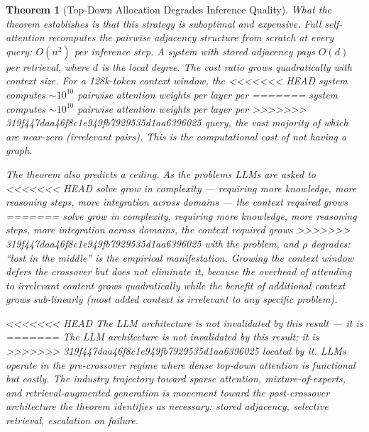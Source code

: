 \documentclass[11pt]{article}
\newtheorem{theorem}{Theorem}
\theoremstyle{definition}
\begin{document}
\begin{theorem}[Top-Down Allocation Degrades Inference Quality]
What the theorem establishes is that this strategy is
\emph{suboptimal and expensive}. Full self-attention recomputes the
pairwise adjacency structure from scratch at every query: $O(n^2)$ per
inference step. A system with stored adjacency pays $O(d)$ per
retrieval, where $d$ is the local degree. The cost ratio grows
quadratically with context size. For a 128k-token context window, the
<<<<<<< HEAD
system computes $\sim$$10^{10}$ pairwise attention weights per layer per
=======
system computes ${\sim}10^{10}$ pairwise attention weights per layer per
>>>>>>> 319f447daa46f8c1e949fb7929535d1aa6396025
query, the vast majority of which are near-zero (irrelevant pairs). This
is the computational cost of not having a graph.

The theorem also predicts a ceiling. As the problems LLMs are asked to
<<<<<<< HEAD
solve grow in complexity --- requiring more knowledge, more reasoning
steps, more integration across domains --- the context required grows
=======
solve grow in complexity, requiring more knowledge, more reasoning
steps, more integration across domains, the context required grows
>>>>>>> 319f447daa46f8c1e949fb7929535d1aa6396025
with the problem, and $\rho$ degrades: ``lost in the middle''
\cite{Liu2024} is the empirical manifestation. Growing the context
window defers the crossover but does not eliminate it, because the
overhead of attending to irrelevant content grows quadratically while
the benefit of additional context grows sub-linearly (most added context
is irrelevant to any specific problem).

<<<<<<< HEAD
The LLM architecture is not invalidated by this result --- it is
=======
The LLM architecture is not invalidated by this result; it is
>>>>>>> 319f447daa46f8c1e949fb7929535d1aa6396025
\emph{located} by it. LLMs operate in the pre-crossover regime where
dense top-down attention is functional but costly. The industry
trajectory toward sparse attention, mixture-of-experts, and
retrieval-augmented generation is movement toward the post-crossover
architecture the theorem identifies as necessary: stored adjacency,
selective retrieval, escalation on failure.


\end{theorem}
\end{document}
